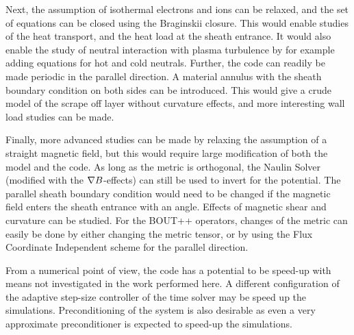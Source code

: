 Next, the assumption of isothermal electrons and ions can be relaxed, and the set of equations can be closed using the Braginskii closure.
This would enable studies of the heat transport, and the heat load at the sheath entrance.
It would also enable the study of neutral interaction with plasma turbulence by for example adding equations for hot and cold neutrals.
Further, the code can readily be made periodic in the parallel direction.
A material annulus with the sheath boundary condition on both sides can be introduced.
This would give a crude model of the scrape off layer without curvature effects, and more interesting wall load studies can be made.

Finally, more advanced studies can be made by relaxing the assumption of a straight magnetic field, but this would require large modification of both the model and the code.
As long as the metric is orthogonal, the Naulin Solver (modified with the $\nabla B$-effects) can still be used to invert for the potential.
The parallel sheath boundary condition would need to be changed if the magnetic field enters the sheath entrance with an angle.
Effects of magnetic shear and curvature can be studied.
For the BOUT++ operators, changes of the metric can easily be done by either changing the metric tensor, or by using the Flux Coordinate Independent scheme for the parallel direction.

From a numerical point of view, the code has a potential to be speed-up with means not investigated in the work performed here.
A different configuration of the adaptive step-size controller of the time solver may be speed up the simulations.
Preconditioning of the system is also desirable as even a very approximate preconditioner is expected to speed-up the simulations.
